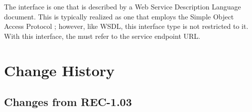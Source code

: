\documentclass[11pt,a4paper]{ivoa}
\begin{document}

The  interface is one that is described by a Web
Service Description Language \citep{booth07} document. This is typically
realized as one that employs the Simple Object Access Protocol
\citep{std:SOAP}; however, like WSDL, this interface type is not
restricted to it. With this interface, the  must
refer to the service endpoint URL.

\appendix

\section{Change History}

\subsection{Changes from REC-1.03}
\end{document}
